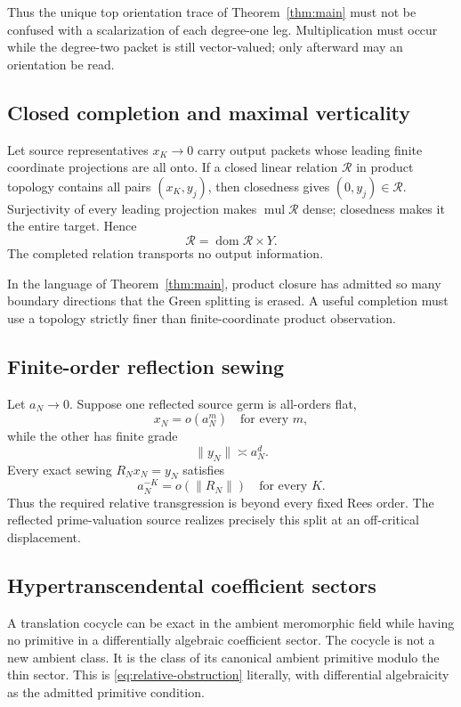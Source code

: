 \documentclass[11pt]{article}
\theoremstyle{definition}
\theoremstyle{remark}
\newcommand{\cR}{\mathcal R}
\newcommand{\mul}{\operatorname{mul}}
\begin{document}
Thus the unique top orientation trace of
Theorem~\ref{thm:main} must not be confused with a scalarization of each
degree-one leg.  Multiplication must occur while the degree-two packet is
still vector-valued; only afterward may an orientation be read.

\subsection{Closed completion and maximal verticality}

Let source representatives \(x_K\to0\) carry output packets whose leading
finite coordinate projections are all onto.  If a closed linear relation
\(\cR\) in product topology contains all pairs \((x_K,y_j)\), then
closedness gives \((0,y_j)\in\cR\).  Surjectivity of every leading
projection makes \(\mul\cR\) dense; closedness makes it the entire target.
Hence
\[
                       \cR=\operatorname{dom}\cR\times Y.
\tag{6.4}\label{eq:maximal-vertical}
\]
The completed relation transports no output information.

In the language of Theorem~\ref{thm:main}, product closure has admitted so
many boundary directions that the Green splitting is erased.  A useful
completion must use a topology strictly finer than finite-coordinate
product observation.

\subsection{Finite-order reflection sewing}

Let \(a_N\to0\).  Suppose one reflected source germ is all-orders flat,
\[
                      x_N=o(a_N^m)\quad\text{for every }m,
\tag{6.5}\label{eq:flat-germ}
\]
while the other has finite grade
\[
                      \|y_N\|\asymp a_N^d.
\tag{6.6}\label{eq:finite-grade}
\]
Every exact sewing \(R_Nx_N=y_N\) satisfies
\[
                  a_N^{-K}=o(\|R_N\|)
                  \quad\text{for every }K.
\tag{6.7}\label{eq:beyond-rees}
\]
Thus the required relative transgression is beyond every fixed Rees order.
The reflected prime-valuation source realizes precisely this split at an
off-critical displacement.

\subsection{Hypertranscendental coefficient sectors}

A translation cocycle can be exact in the ambient meromorphic field while
having no primitive in a differentially algebraic coefficient sector.
The cocycle is not a new ambient class.  It is the class of its canonical
ambient primitive modulo the thin sector.  This is
\eqref{eq:relative-obstruction} literally, with differential algebraicity
as the admitted primitive condition.
\end{document}
